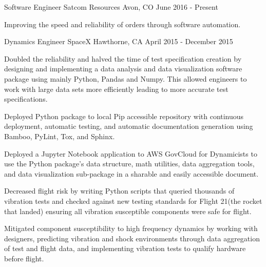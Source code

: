 

\begin{cventries}

  \cventry
    {Software Engineer} %
    {Satcom Resources} %
    {Avon, CO} %
    {June 2016 - Present} %
    {
      \begin{cvitems} %
        \item {Improving the speed and reliability of orders through software automation.}
      \end{cvitems}
    }

  \cventry
    {Dynamics Engineer} %
    {SpaceX} %
    {Hawthorne, CA} %
    {April 2015 - December 2015} %
    {
      \begin{cvitems} %
        \item {Doubled the reliability and halved the time of test specification creation by designing and implementing a data analysis and data visualization software package using mainly Python, Pandas and Numpy. This allowed engineers to work with large data sets more efficiently leading to more accurate test specifications.}
        \item {Deployed Python package to local Pip accessible repository with continuous deployment, automatic testing, and automatic documentation generation using Bamboo, PyLint, Tox, and Sphinx.}
        \item {Deployed a Jupyter Notebook application to AWS GovCloud for Dynamicists to use the Python package’s data structure, math utilities, data aggregation tools, and data visualization sub-package in a sharable and easily accessible document.}
        \item {Decreased flight risk by writing Python scripts that queried thousands of vibration tests and checked against new testing standards for Flight 21(the rocket that landed) ensuring all vibration susceptible components were safe for flight.}
        \item {Mitigated component susceptibility to high frequency dynamics by working with designers, predicting vibration and shock environments through data aggregation of test and flight data, and implementing vibration tests to qualify hardware before flight.}
      \end{cvitems}
    }


\end{cventries}
